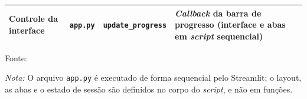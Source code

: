 \begin{quadro}[ht]
\begin{center}
\begin{threeparttable}
\begin{tabularx}{\textwidth}{|>{\raggedright\arraybackslash}p{2.8cm}|>{\raggedright\arraybackslash}p{2.4cm}|>{\raggedright\arraybackslash}X|>{\raggedright\arraybackslash}X|}
Controle da interface & \texttt{app.py} & \texttt{update\_progress} & \textit{Callback} da barra de progresso (interface e abas em \textit{script} sequencial) \\ \hline
\end{tabularx}
\begin{tablenotes}[flushleft]
\footnotesize
\item Fonte:~\oautor
\item \textit{Nota:} O arquivo \texttt{app.py} é executado de forma sequencial pelo Streamlit; o layout, as abas e o estado de sessão são definidos no corpo do \textit{script}, e não em funções.
\end{tablenotes}
\end{threeparttable}
\end{center}
\end{quadro}

